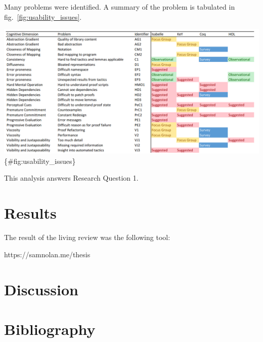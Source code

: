 \documentclass[
]{article}
\begin{document}
Many problems were identified. A summary of the problem is tabulated in
fig.~\ref{fig:usability_issues}.

\includegraphics{./Images/MyProblem.png} \{\#fig:usability\_issues\}

This analysis answers Research Question 1.

\hypertarget{results}{%
\section{Results}\label{results}}

The result of the living review was the following tool:

https://samnolan.me/thesis

\hypertarget{itps}{}

\hypertarget{discussion}{%
\section{Discussion}\label{discussion}}

\hypertarget{bibliography}{%
\section*{Bibliography}\label{bibliography}}
\end{document}
